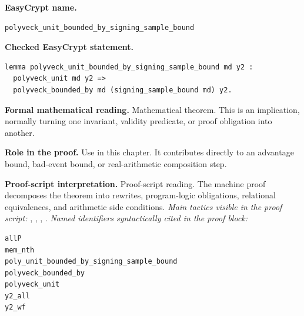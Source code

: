 \begin{formaltheorem}
\noindent\textbf{EasyCrypt name.}
\begin{lstlisting}[language=EasyCrypt,basicstyle=\ttfamily\scriptsize]
polyveck_unit_bounded_by_signing_sample_bound
\end{lstlisting}
\noindent\textbf{Checked EasyCrypt statement.}
\begin{lstlisting}[language=EasyCrypt,basicstyle=\ttfamily\scriptsize]
lemma polyveck_unit_bounded_by_signing_sample_bound md y2 :
  polyveck_unit md y2 =>
  polyveck_bounded_by md (signing_sample_bound md) y2.
\end{lstlisting}
\noindent\textbf{Formal mathematical reading.}
Mathematical theorem. This is an implication, normally turning one invariant, validity predicate, or proof obligation into another.

\noindent\textbf{Role in the proof.}
Use in this chapter. It contributes directly to an advantage bound, bad-event bound, or real-arithmetic composition step.

\noindent\textbf{Proof-script interpretation.}
Proof-script reading. The machine proof decomposes the theorem into rewrites, program-logic obligations, relational equivalences, and arithmetic side conditions.
\emph{Main tactics visible in the proof script:} , , , .
\emph{Named identifiers syntactically cited in the proof block:}
\begin{lstlisting}[language=EasyCrypt,basicstyle=\ttfamily\scriptsize]
allP
mem_nth
poly_unit_bounded_by_signing_sample_bound
polyveck_bounded_by
polyveck_unit
y2_all
y2_wf
\end{lstlisting}

\end{formaltheorem}

